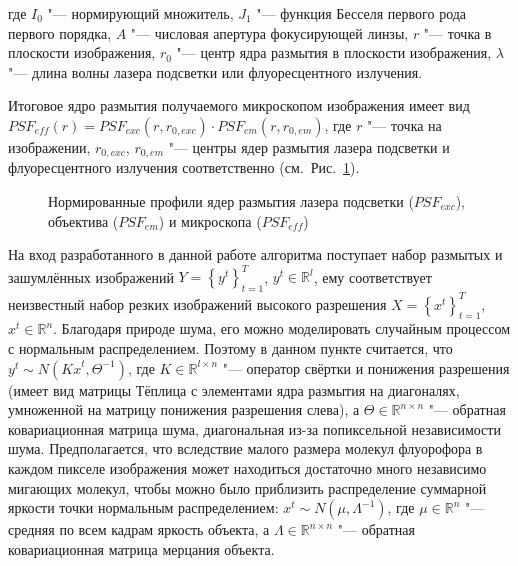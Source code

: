\noindent где $I_0$ "--- нормирующий множитель, $J_1$ "--- функция Бесселя первого рода первого порядка, $A$ "--- числовая апертура фокусирующей линзы, $r$ "--- точка в плоскости изображения, $r_0$ "--- центр ядра размытия в плоскости изображения, $\lambda$ "--- длина волны лазера подсветки или флуоресцентного излучения.

Итоговое ядро размытия получаемого микроскопом изображения имеет вид $PSF_{eff}\left(r\right)=PSF_{exc}\left(r,r_{0,exc}\right)\cdot PSF_{em}\left(r,r_{0,em}\right)$, где $r$ "--- точка на изображении, $r_{0,exc}$, $r_{0,em}$ "--- центры ядер размытия лазера подсветки и флуоресцентного излучения соответственно (см.~Рис.~\ref{fig:sinopsis-blinking-psf}).

\begin{figure}[ht]
	\caption{Нормированные профили ядер размытия лазера подсветки ($PSF_{exc}$), объектива ($PSF_{em}$) и микроскопа ($PSF_{eff}$)}
	\label{fig:sinopsis-blinking-psf}
\end{figure}


На вход разработанного в данной работе алгоритма поступает набор размытых и зашумлённых изображений $Y=\left\{y^t\right\}_{t=1}^T$, $y^t\in\mathbb{R}^l$, ему соответствует неизвестный набор резких изображений высокого разрешения $X=\left\{x^t\right\}_{t=1}^T$, $x^t\in\mathbb{R}^n$. Благодаря природе шума, его можно моделировать случайным процессом с нормальным распределением.
Поэтому в данном пункте считается, что $y^t \sim N({Kx}^t,\Theta^{-1})$, где $K\in\mathbb{R}^{l \times n}$ "--- оператор свёртки и понижения разрешения (имеет вид матрицы Тёплица с элементами ядра размытия на диагоналях, умноженной на матрицу понижения разрешения слева), а $\Theta\in\mathbb{R}^{n \times n}$ "--- обратная ковариационная матрица шума, диагональная из-за попиксельной независимости шума. Предполагается, что вследствие малого размера молекул флуорофора в каждом пикселе изображения может находиться достаточно много независимо мигающих молекул, чтобы можно было приблизить распределение суммарной яркости точки нормальным распределением: $x^t \sim N(\mu,\Lambda^{-1})$, где $\mu\in\mathbb{R}^n$ "--- средняя по всем кадрам яркость объекта, а $\Lambda\in\mathbb{R}^{n \times n}$ "--- обратная ковариационная матрица мерцания объекта.

